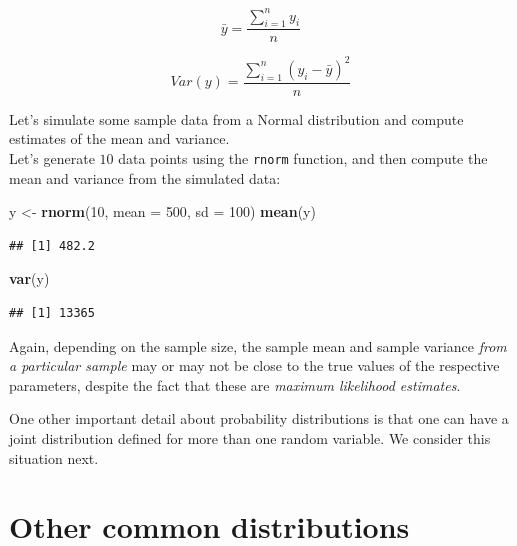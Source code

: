 \documentclass[12pt,]{krantz}
\newenvironment{Shaded}{\begin{snugshade}}{\end{snugshade}}
\newcommand{\DataTypeTok}[1]{\textcolor[rgb]{0.13,0.29,0.53}{#1}}
\newcommand{\DecValTok}[1]{\textcolor[rgb]{0.00,0.00,0.81}{#1}}
\newcommand{\KeywordTok}[1]{\textcolor[rgb]{0.13,0.29,0.53}{\textbf{#1}}}
\newcommand{\NormalTok}[1]{#1}
\newcommand{\StringTok}[1]{\textcolor[rgb]{0.31,0.60,0.02}{#1}}
\begin{document}
\begin{equation}
\bar{y} =  \frac{\sum_{i=1}^n y_i}{n} 
\end{equation}

\begin{equation}
Var(y) = \frac{\sum_{i=1}^n (y_i-
\bar{y})^2}{n}
\end{equation}

Let's simulate some sample data from a Normal distribution and compute estimates of the mean and variance.\\
Let's generate \(10\) data points using the \texttt{rnorm} function, and then compute the mean and variance from the simulated data:

\begin{Shaded}
\begin{Highlighting}[]
\NormalTok{y <-}\StringTok{ }\KeywordTok{rnorm}\NormalTok{(}\DecValTok{10}\NormalTok{, }\DataTypeTok{mean =} \DecValTok{500}\NormalTok{, }\DataTypeTok{sd =} \DecValTok{100}\NormalTok{)}
\KeywordTok{mean}\NormalTok{(y)}
\end{Highlighting}
\end{Shaded}

\begin{verbatim}
## [1] 482.2
\end{verbatim}

\begin{Shaded}
\begin{Highlighting}[]
\KeywordTok{var}\NormalTok{(y)}
\end{Highlighting}
\end{Shaded}

\begin{verbatim}
## [1] 13365
\end{verbatim}

Again, depending on the sample size, the sample mean and sample variance \emph{from a particular sample} may or may not be close to the true values of the respective parameters, despite the fact that these are \emph{maximum likelihood estimates}.

One other important detail about probability distributions is that one can have a joint distribution defined for more than one random variable. We consider this situation next.

\hypertarget{other-common-distributions}{%
\section{Other common distributions}\label{other-common-distributions}}
\end{document}
